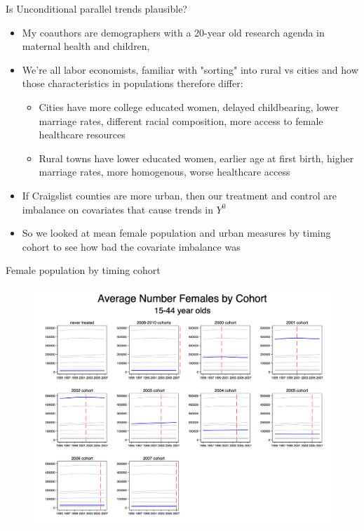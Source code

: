 \documentclass{beamer}
\begin{document}
\begin{frame}{Is Unconditional parallel trends plausible?}

\begin{itemize}
\item My coauthors are demographers with a 20-year old research agenda in maternal health and children, 
\item We're all labor economists, familiar with "sorting" into rural vs cities and how those characteristics in populations therefore differ:
	\begin{itemize}
	\item Cities have more college educated women, delayed childbearing, lower marriage rates, different racial composition, more access to female healthcare resources
	\item Rural towns have lower educated women, earlier age at first birth, higher marriage rates, more homogenous, worse healthcare access
	\end{itemize}
\item If Craigslist counties are more urban, then our treatment and control are imbalance on covariates that cause trends in $Y^0$
\item So we looked at mean female population and urban measures by timing cohort to see how bad the covariate imbalance was
\end{itemize}

\end{frame}


\begin{frame}{Female population by timing cohort}

\begin{figure}
    \centering
    \includegraphics[height=0.85\textheight]{./lecture_includes/pretty_fempop}
\end{figure}

\end{frame}
\end{document}
